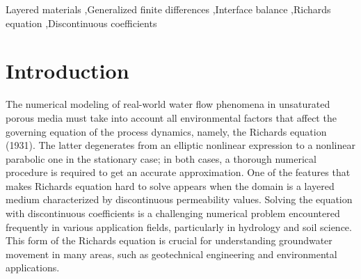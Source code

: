 \documentclass[a4paper,fleqn]{cas-sc}
\begin{document}


\begin{keywords}
Layered materials \sep Generalized finite differences \sep  Interface balance \sep Richards equation \sep Discontinuous coefficients 
\end{keywords}

\maketitle

\section{Introduction}

The numerical modeling of real-world water flow phenomena in unsaturated porous media must take into account all environmental factors that affect the governing equation of the process dynamics, namely, the Richards equation (1931). The latter degenerates from an elliptic nonlinear expression to a nonlinear parabolic one in the stationary case; in both cases, a thorough numerical procedure is required to get an accurate approximation. One of the features that makes Richards equation hard to solve appears when the domain is a layered medium characterized by discontinuous permeability values. Solving the equation with discontinuous coefficients is a challenging numerical problem encountered frequently in various application fields, particularly in hydrology and soil science. This form of the Richards equation is crucial for understanding groundwater movement in many areas, such as geotechnical engineering and environmental applications.
\end{document}
